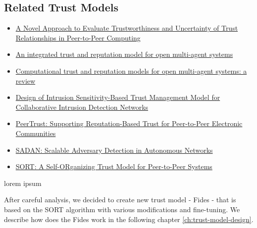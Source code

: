\subsection{Related Trust Models}
\label{subsec:related-trust-models}

\begin{itemize}
    \item \href{https://share.goodnotes.com/s/60IVzs1mgmuPWF54Us5eKA}{A Novel Approach to Evaluate Trustworthiness and Uncertainty of Trust Relationships in Peer-to-Peer Computing} 
    \item \href{https://share.goodnotes.com/s/EziqqW185BzxHxNrZ6d1MQ}{An integrated trust and reputation model for open multi-agent systems}
    \item \href{https://share.goodnotes.com/s/MRfXxmu2Lz51IqK7JODn1N}{Computational trust and reputation models for open multi-agent systems: a review}
    \item \href{https://share.goodnotes.com/s/tafBG1KUZCuYT2E7a3ucc9}{Design of Intrusion Sensitivity-Based Trust Management Model for Collaborative Intrusion Detection Networks}
    \item \href{https://share.goodnotes.com/s/YQuoXUbYADa15Hwe90sXCM}{ PeerTrust: Supporting Reputation-Based Trust for Peer-to-Peer Electronic Communities}
    \item \href{https://share.goodnotes.com/s/hRHxSYlk6wU4BEn6u9Jcyu}{SADAN: Scalable Adversary Detection in Autonomous Networks}
    \item \href{https://share.goodnotes.com/s/bXWUbVFi5qBiAdBmJ4yYAx}{SORT: A Self-ORganizing Trust Model for Peer-to-Peer Systems}
\end{itemize}
lorem ipsum
\vspace{1cm}

\noindent
After careful analysis, we decided to create new trust model - Fides - that is based on the SORT algorithm with various modifications and fine-tuning.
We describe how does the Fides work in the following chapter \ref{ch:trust-model-design}.